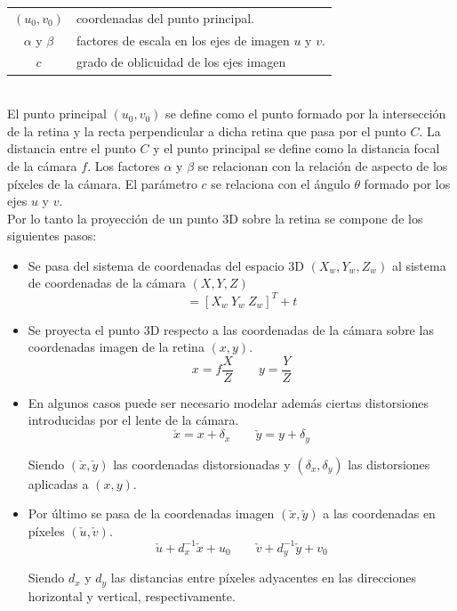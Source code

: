 \begin{tabular}{cp{}}


$(u_0, v_0)$ &  coordenadas del punto principal. \\ 
$\alpha$ y $\beta$ & factores de escala en los ejes de imagen  $u$ y $v$. \\ 
$c$ & grado de oblicuidad de los ejes imagen
\end{tabular} \\

El punto principal $(u_0, v_0)$ se define como el punto formado por la intersección de la retina y la recta perpendicular a dicha retina que pasa por el punto $C$. La distancia entre el punto $C$ y el punto principal se define como la distancia focal de la cámara $f$. Los factores $\alpha$ y $\beta$ se relacionan con la relación de aspecto de los píxeles de la cámara. El parámetro $c$ se relaciona con el ángulo $\theta$ formado por los ejes $u$ y $v$.\\

Por lo tanto la proyección de un punto 3D sobre la retina se compone de los siguientes pasos:\\

\begin{itemize}
\item Se pasa del sistema de coordenadas del espacio 3D $(X_w, Y_w, Z_w)$ al sistema de coordenadas de la cámara $(X,Y, Z)$
\begin{equation}
[X \ Y \ Z] = [X_w \ Y_w \ Z_w]^T + t
\end{equation}
\item Se proyecta el punto 3D respecto a las coordenadas de la cámara sobre las coordenadas imagen de la retina $(x,y)$.
\begin{equation}
x=f \dfrac{X}{Z} \qquad y = \dfrac{Y}{Z}
\end{equation}
\item En algunos casos puede ser necesario modelar además ciertas distorsiones introducidas por el lente de la cámara.
\begin{equation}
\check{x} = x + \delta_x \qquad \check{y} = y + \delta_y
\end{equation}

Siendo $(\check{x},\check{y})$ las coordenadas distorsionadas y $(\delta_x, \delta_y)$ las distorsiones aplicadas a $(x,y)$.

\item Por último se pasa de la coordenadas imagen $(\check{x}, \check{y})$ a las coordenadas en píxeles $(\check{u}, \check{v})$.
\vspace{-0.05cm}
\begin{equation}
\check{u} + d_x ^{-1}\check{x} + u_0 \qquad \check{v} + d_y ^{-1}\check{y} + v_0
\end{equation}

Siendo $d_x$ y $d_y$ las distancias entre píxeles adyacentes en las direcciones horizontal y vertical, respectivamente.\\
\end{itemize}


